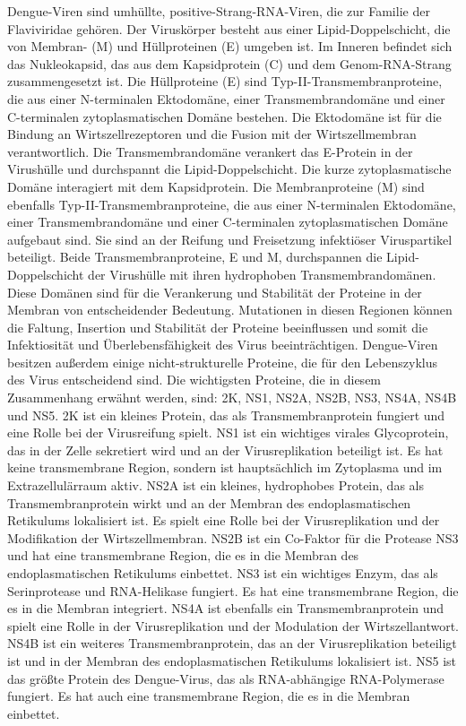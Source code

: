 \documentclass[german,version-2022-01]{uzl-thesis}
\begin{document}
Dengue-Viren sind umh\"ullte, positive-Strang-RNA-Viren, die zur Familie der Flaviviridae geh\"oren. Der Virusk\"orper besteht aus einer Lipid-Doppelschicht, die von Membran- (M) und H\"ullproteinen (E) umgeben ist. Im Inneren befindet sich das Nukleokapsid, das aus dem Kapsidprotein (C) und dem Genom-RNA-Strang zusammengesetzt ist. Die H\"ullproteine (E) sind Typ-II-Transmembranproteine, die aus einer N-terminalen Ektodom\"ane, einer Transmembrandom\"ane und einer C-terminalen zytoplasmatischen Dom\"ane bestehen. Die Ektodom\"ane ist f\"ur die Bindung an Wirtszellrezeptoren und die Fusion mit der Wirtszellmembran verantwortlich. Die Transmembrandom\"ane verankert das E-Protein in der Virush\"ulle und durchspannt die Lipid-Doppelschicht. Die kurze zytoplasmatische Dom\"ane interagiert mit dem Kapsidprotein. Die Membranproteine (M) sind ebenfalls Typ-II-Transmembranproteine, die aus einer N-terminalen Ektodom\"ane, einer Transmembrandom\"ane und einer C-terminalen zytoplasmatischen Dom\"ane aufgebaut sind. Sie sind an der Reifung und Freisetzung infekti\"oser Viruspartikel beteiligt. Beide Transmembranproteine, E und M, durchspannen die Lipid-Doppelschicht der Virush\"ulle mit ihren hydrophoben Transmembrandom\"anen. Diese Dom\"anen sind f\"ur die Verankerung und Stabilit\"at der Proteine in der Membran von entscheidender Bedeutung. Mutationen in diesen Regionen k\"onnen die Faltung, Insertion und Stabilit\"at der Proteine beeinflussen und somit die Infektiosit\"at und \"Uberlebensf\"ahigkeit des Virus beeintr\"achtigen. Dengue-Viren besitzen au\ss{}erdem einige nicht-strukturelle Proteine, die f\"ur den Lebenszyklus des Virus entscheidend sind. Die wichtigsten Proteine, die in diesem Zusammenhang erw\"ahnt werden, sind: 2K, NS1, NS2A, NS2B, NS3, NS4A, NS4B und NS5. 2K ist ein kleines Protein, das als Transmembranprotein fungiert und eine Rolle bei der Virusreifung spielt. NS1 ist ein wichtiges virales Glycoprotein, das in der Zelle sekretiert wird und an der Virusreplikation beteiligt ist. Es hat keine transmembrane Region, sondern ist haupts\"achlich im Zytoplasma und im Extrazellul\"arraum aktiv. NS2A ist ein kleines, hydrophobes Protein, das als Transmembranprotein wirkt und an der Membran des endoplasmatischen Retikulums lokalisiert ist. Es spielt eine Rolle bei der Virusreplikation und der Modifikation der Wirtszellmembran. NS2B ist ein Co-Faktor f\"ur die Protease NS3 und hat eine transmembrane Region, die es in die Membran des endoplasmatischen Retikulums einbettet. NS3 ist ein wichtiges Enzym, das als Serinprotease und RNA-Helikase fungiert. Es hat eine transmembrane Region, die es in die Membran integriert. NS4A ist ebenfalls ein Transmembranprotein und spielt eine Rolle in der Virusreplikation und der Modulation der Wirtszellantwort. NS4B ist ein weiteres Transmembranprotein, das an der Virusreplikation beteiligt ist und in der Membran des endoplasmatischen Retikulums lokalisiert ist. NS5 ist das gr\"o\ss{}te Protein des Dengue-Virus, das als RNA-abh\"angige RNA-Polymerase fungiert. Es hat auch eine transmembrane Region, die es in die Membran einbettet.
\end{document}
